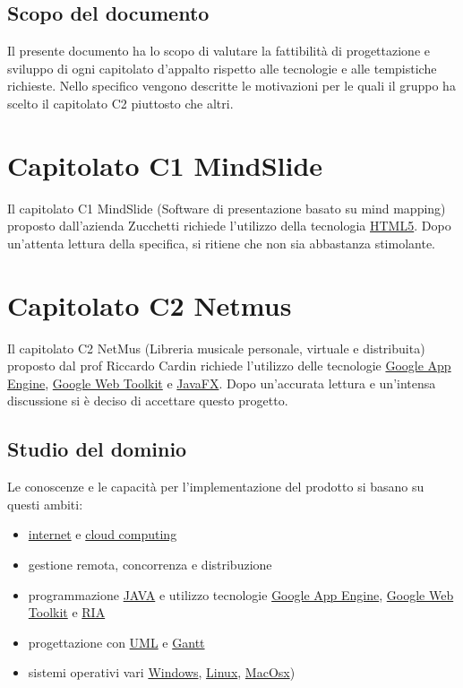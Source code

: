 \section{Scopo del documento}
Il presente documento ha lo scopo di valutare la fattibilit\`a di progettazione
e sviluppo di ogni capitolato d'appalto rispetto alle tecnologie e alle tempistiche richieste. Nello specifico vengono descritte le motivazioni per le quali il gruppo ha scelto il capitolato C2 piuttosto che altri.




\chapter{Capitolato C1 MindSlide}
Il capitolato C1 MindSlide (Software di presentazione basato su mind mapping)
proposto dall'azienda Zucchetti richiede l'utilizzo della tecnologia
\underline{HTML5}. Dopo un'attenta lettura della specifica, si ritiene che non
sia abbastanza stimolante.

\chapter{Capitolato C2 Netmus}
Il capitolato C2 NetMus (Libreria musicale personale, virtuale e distribuita)
proposto dal prof Riccardo Cardin richiede l'utilizzo delle tecnologie \underline{Google
App Engine}, \underline{Google Web Toolkit} e \underline{JavaFX}. Dopo
un'accurata lettura e un'intensa discussione si \`e deciso di accettare questo progetto.
\section{Studio del dominio} 
Le conoscenze e le capacit\`a per l'implementazione del prodotto si basano su
questi ambiti:
\begin{itemize}
  \item \underline{internet} e \underline{cloud computing}
  \item gestione remota, concorrenza e distribuzione
  \item programmazione \underline{JAVA} e utilizzo tecnologie \underline{Google App
  Engine}, \underline{Google Web Toolkit} e \underline{RIA}
  \item progettazione con \underline{UML} e \underline{Gantt}
  \item sistemi operativi vari \underline{Windows}, \underline{Linux},
  \underline{MacOsx})
\end{itemize}

